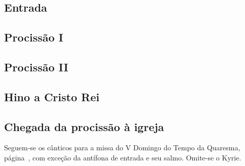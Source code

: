 
\subsection{Entrada}\label{subsection:hebdomada-sancta/dominica-in-palmis-de-passione-domini/introitus}

\AllowPageBreak

\subsection{Procissão I}\label{subsection:hebdomada-sancta/dominica-in-palmis-de-passione-domini/ad-processionem-1}

\AllowPageFlush

\subsection{Procissão II}\label{subsection:hebdomada-sancta/dominica-in-palmis-de-passione-domini/ad-processionem-2}

\subsection{Hino a Cristo Rei}\label{subsection:hebdomada-sancta/dominica-in-palmis-de-passione-domini/hymnus-ad-christum-regem}

\subsection{Chegada da procissão à igreja}\label{subsection:hebdomada-sancta/dominica-in-palmis-de-passione-domini/ingrediente-processione-in-ecclesiam}

\begin{rubrica}
  Seguem-se os cânticos para a missa do V Domingo do Tempo da Quaresma, página~\pageref{section:tempus-quadragesimae/dominica-5}, com exceção da antífona de entrada e seu salmo. Omite-se o Kyrie.
\end{rubrica}